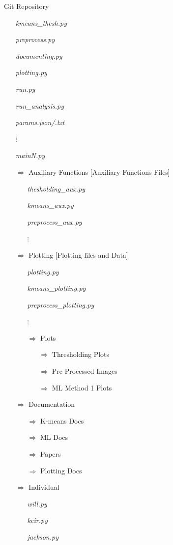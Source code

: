 \documentclass[12pt]{amsart}
\begin{document}
\begin{multicols}{2}
Git Repository
\vspace*{-11pt}
\begin{itemize}
	\item[] \textit{kmeans\_thesh.py}
	\item[] \textit{preprocess.py}
	\item[] \textit{documenting.py}
	\item[] \textit{plotting.py}
	\item[] \textit{run.py}
	\item[] \textit{run\_analysis.py}
	\item[] \textit{params.json/.txt}
	\item[]  $\vdots$
	\item[]  \textit{mainN.py}
	\item[$\Rightarrow$] Auxiliary Functions [Auxiliary Functions Files]
		\begin{itemize}
			\item[] \textit{thesholding\_aux.py}
			\item[] \textit{kmeans\_aux.py}
			\item[] \textit{preprocess\_aux.py}
			\item[] $\vdots$
		\end{itemize}
	\item[$\Rightarrow$] Plotting [Plotting files and Data]
		\begin{itemize}
			\item[] \textit{plotting.py}
			\item[] \textit{kmeans\_plotting.py}
			\item[] \textit{preprocess\_plotting.py}
			\item[] $\vdots$
			\item[$\Rightarrow$] Plots
			\begin{itemize}
				\item[$\Rightarrow$] Thresholding Plots
				\item[$\Rightarrow$] Pre Processed Images
				\item[$\Rightarrow$] ML Method 1 Plots
			\end{itemize}
		\end{itemize}
	\item[$\Rightarrow$] Documentation
			\begin{itemize}
				\item[$\Rightarrow$] K-means Docs
				\item[$\Rightarrow$] ML Docs
				\item[$\Rightarrow$] Papers
				\item[$\Rightarrow$] Plotting Docs
			\end{itemize}
	\item[$\Rightarrow$] Individual
		\begin{itemize}
			\item[] \textit{will.py}
			\item[] \textit{keir.py}
			\item[] \textit{jackson.py}
		\end{itemize}
\end{itemize}
\end{multicols}
\end{document}
